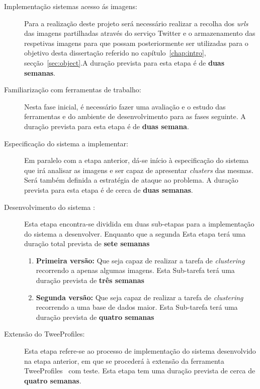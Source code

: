 \begin{description}
\item[Implementação sistemas acesso ás imagens:] Para a realização deste projeto será necessário realizar a recolha dos \textit{urls} das imagens partilhadas através do serviço Twitter e o armazenamento das respetivas imagens para que possam posteriormente ser utilizadas para o objetivo desta dissertação referido no capítulo~\ref{chap:intro}, secção~\ref{sec:object}.A duração prevista para esta etapa é de \textbf{duas semanas}.

\item[Familiarização com ferramentas de trabalho:] Nesta fase inicial, é necessário fazer uma avaliação e o estudo das ferramentas e do ambiente de desenvolvimento para as fases seguinte. A duração prevista para esta etapa é de \textbf{duas semana}.

\item[Especificação do sistema a implementar: ] Em paralelo com a etapa anterior, dá-se início à especificação do sistema que irá analisar as imagens e ser capaz de apresentar \textit{clusters} das mesmas. Será também definida a estratégia de ataque ao problema. A duração prevista para esta etapa é de cerca de \textbf{duas semanas}.

\item[Desenvolvimento do sistema :] Esta etapa encontra-se dividida em duas sub-etapas para a implementação do sistema a desenvolver. Enquanto que a segunda  Esta etapa terá uma duração total prevista de \textbf{sete semanas}

\begin{enumerate}
\item \textbf{Primeira versão: } Que seja capaz de realizar a tarefa de \textit{clustering} recorrendo a apenas algumas imagens. Esta Sub-tarefa terá uma duração prevista de \textbf{três semanas}
\item \textbf{Segunda versão: } Que seja capaz de realizar a tarefa de \textit{clustering} recorrendo a uma base de dados maior. Esta Sub-tarefa terá uma duração prevista de \textbf{quatro semanas}
\end{enumerate}

\item[Extensão do TweeProfiles: ] Esta etapa refere-se ao processo de implementação do sistema desenvolvido na etapa anterior, em que se procederá à extensão da ferramenta TweeProfiles~\citet{Cunha2013} com teste. Esta etapa tem uma duração prevista de cerca de \textbf{quatro semanas}.  


\end{description}
